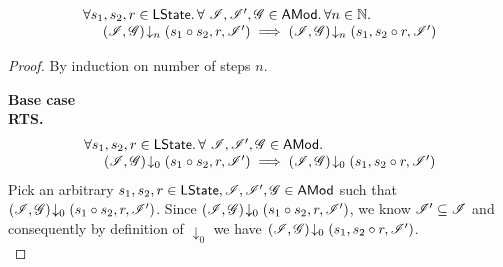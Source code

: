 \begin{lemma}\label{lem:forget-closure}
%
\[
\begin{array}{l}
	\forall s_1, s_2, r \in \textsf{LState}.\, \forall \ \mathscr{I}, \mathscr{I}', \mathscr{G} \in \textsf{AMod}.\,\forall n \in \mathbb{N}.\,\\
	\hspace*{0.5cm} \left(\mathscr{I}, \mathscr{G}\right) \!\downarrow_{n} \left(s_1 \circ s_2, r, \mathscr{I}'\right) \implies 
									\left(\mathscr{I}, \mathscr{G}\right) \!\downarrow_{n} \left(s_1, s_2 \circ r, \mathscr{I}'\right)
\end{array}
\]
%
\begin{proof} By induction on number of steps $n$.

\noindent\textbf{Base case}\\
\textbf{RTS. }
%
\[
\begin{array}{l}
	\forall s_1, s_2, r \in \textsf{LState}.\, \forall \ \mathscr{I}, \mathscr{I}', \mathscr{G} \in \textsf{AMod}.\,\\
	\hspace*{0.5cm} \left(\mathscr{I}, \mathscr{G}\right) \!\downarrow_{0} \left(s_1 \circ s_2, r, \mathscr{I}'\right) \implies 
									\left(\mathscr{I}, \mathscr{G}\right) \!\downarrow_{0} \left(s_1, s_2 \circ r, \mathscr{I}'\right)
\end{array}
\]
%
Pick an arbitrary $s_1, s_2, r \in \textsf{LState}, \mathscr{I}, \mathscr{I}', \mathscr{G} \in \textsf{AMod}$ such that $\left(\mathscr{I}, \mathscr{G}\right) \!\downarrow_{0} \left(s_1 \circ s_2, r, \mathscr{I}'\right)$.
Since $\left(\mathscr{I}, \mathscr{G}\right) \!\downarrow_{0} \left(s_1 \circ s_2, r, \mathscr{I}'\right)$, we know $\mathscr{I}' \subseteq \mathscr{I}$  and consequently by definition of $\downarrow_0$ we have $\left(\mathscr{I}, \mathscr{G}\right) \!\downarrow_{0} \left(s_1, s_2 \circ r, \mathscr{I}'\right)$.\\


\end{proof}
\end{lemma}
